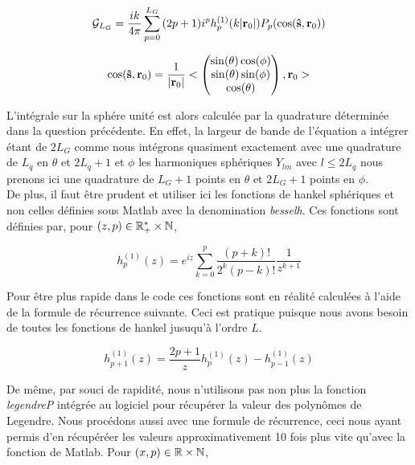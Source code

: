 \documentclass[10pt]{article}
\begin{document}
\begin{multicols}{2}
\begin{equation}
\mathcal{G}_{L_G} = \frac{ik}{4\pi}\sum_{p=0}^{L_G}{(2p+1)i^{p}h_p^{(1)}(k|{\bf r}_0|)P_p(\cos({\bf \hat{s}}, {\bf r}_0))}
\end{equation}

\vspace*{-11pt}

\begin{equation}
\cos({\bf \hat{s}}, {\bf r}_0) = \frac{1}{|{\bf r}_0|}< \begin{pmatrix} \sin(\theta)\cos(\phi)  \\ \sin(\theta)\sin(\phi)  \\ \cos(\theta) \end{pmatrix} , {\bf r}_0 >
\end{equation}


L'intégrale sur la sphére unité est alors calculée par la quadrature déterminée dans la question précédente. En effet, la largeur de bande de l'équation a intégrer étant de $2L_G$ comme nous intégrons quasiment exactement avec une quadrature de $L_q$ en $\theta$ et $2L_q+1$ et $\phi$ les harmoniques sphériques $Y_{lm}$ avec $l \le 2L_q$ nous prenons ici une quadrature de $L_G+1$ points en $\theta$ et $2L_G+1$ points en $\phi$. \\
\indent
De plus, il faut être prudent et utiliser ici les fonctions de hankel sphériques et non celles définies sous Matlab avec la denomination \textit{besselh}. Ces fonctions sont définies par, pour $(z,p) \in \mathbb{R}^{*}_{+}\times\mathbb{N}$,

\begin{equation}
	h^{(1)}_{p}(z) = e^{iz}\sum_{k=0}^{p}{\frac{(p+k)!}{2^{k}(p-k)!}\frac{1}{z^{k+1}}}
\end{equation}

Pour être plus rapide dans le code ces fonctions sont en réalité calculées à l'aide de la formule de récurrence suivante. Ceci est pratique puisque nous avons besoin de toutes les fonctions de hankel jusuqu'à l'ordre $L$.

\begin{equation}
	h_{p+1}^{(1)}(z) =  \frac{2p+1}{z}h_{p}^{(1)}(z) - h_{p-1}^{(1)}(z) 
\end{equation}

De même, par souci de rapidité, nous n'utilisons pas non plus la fonction \textit{legendreP} intégrée au logiciel pour récupérer la valeur des polynômes de Legendre. Nous procédons aussi avec une formule de récurrence, ceci nous ayant permis d'en récupéréer les valeurs approximativement 10 fois plus vite qu'avec la fonction de Matlab. Pour $(x,p) \in \mathbb{R}\times\mathbb{N}$, 


\end{multicols}
\end{document}
